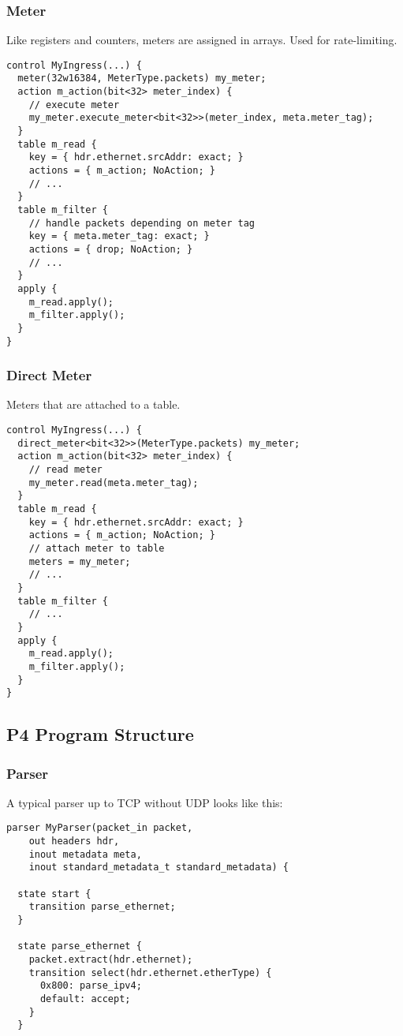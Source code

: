 \documentclass[a4paper, fontsize=8pt, landscape, DIV=1]{scrartcl}
\begin{document}
\begin{multicols*}{3}
  \subsubsection{Meter}
  Like registers and counters, meters are assigned in arrays. Used for rate-limiting.
  \begin{lstlisting}[style=P4style]
control MyIngress(...) {
  meter(32w16384, MeterType.packets) my_meter;
  action m_action(bit<32> meter_index) {
    // execute meter
    my_meter.execute_meter<bit<32>>(meter_index, meta.meter_tag);
  }
  table m_read {
    key = { hdr.ethernet.srcAddr: exact; }
    actions = { m_action; NoAction; }
    // ...
  }
  table m_filter {
    // handle packets depending on meter tag
    key = { meta.meter_tag: exact; }
    actions = { drop; NoAction; }
    // ...
  }
  apply {
    m_read.apply();
    m_filter.apply();
  }
} \end{lstlisting}


  \subsubsection{Direct Meter}
  Meters that are attached to a table.
  \begin{lstlisting}[style=P4style]
control MyIngress(...) {
  direct_meter<bit<32>>(MeterType.packets) my_meter;
  action m_action(bit<32> meter_index) {
    // read meter
    my_meter.read(meta.meter_tag);
  }
  table m_read {
    key = { hdr.ethernet.srcAddr: exact; }
    actions = { m_action; NoAction; }
    // attach meter to table
    meters = my_meter;
    // ...
  }
  table m_filter {
    // ...
  }
  apply {
    m_read.apply();
    m_filter.apply();
  }
} \end{lstlisting}


\subsection{P4 Program Structure}
  \subsubsection{Parser}
  A typical parser up to TCP without UDP looks like this:
  \begin{lstlisting}[style=P4style]
parser MyParser(packet_in packet,
    out headers hdr,
    inout metadata meta,
    inout standard_metadata_t standard_metadata) {

  state start {
    transition parse_ethernet;
  }

  state parse_ethernet {
    packet.extract(hdr.ethernet);
    transition select(hdr.ethernet.etherType) {
      0x800: parse_ipv4;
      default: accept;
    }
  }


\end{lstlisting}
\end{multicols*}
\end{document}
